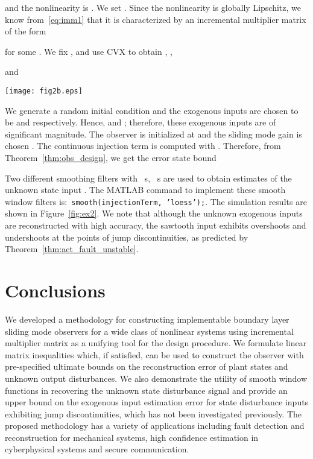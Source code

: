 \documentclass[times, doublespace]{rncauth}
\begin{document}
and the nonlinearity is . We set . Since the nonlinearity is globally Lipschitz, we know from~\eqref{eq:imm1} that it is characterized by an incremental multiplier matrix of the form 

for some . We fix ,  and use CVX to obtain , ,


and

\begin{figure*}[!ht]
	\centering
	\texttt{[image: fig2b.eps]}
	\caption{Simulation Results. (Top left) The actual (blue) and estimated (red dashed) trajectories of the unmeasured state  are shown. (Top right) Zoom-in of error trajectory and the computed plant state error bound. We note that the bound (black dashed) is not conservative. (Bottom) We illustrate that the exogenous inputs are estimated with high accuracy.}
	\label{fig:ex2}
\end{figure*}
We generate a random initial condition 
 and the exogenous inputs are chosen to be 
 and  respectively. Hence,  and ; therefore, these exogenous inputs are of significant magnitude. The observer is initialized at  and the sliding mode gain is chosen . The continuous injection term  is computed with .
Therefore, from Theorem~\ref{thm:obs_design}, we get the error state bound

Two different smoothing filters with ~s, ~s are used to obtain estimates of the unknown state input . The MATLAB command to implement these smooth window filters is:~\texttt{smooth(injectionTerm, 'loess');}. The simulation results are shown in Figure~\ref{fig:ex2}. We note that although the unknown exogenous inputs are reconstructed with high accuracy, the sawtooth input  exhibits overshoots and undershoots at the points of jump discontinuities, as predicted by Theorem~\ref{thm:act_fault_unstable}.

\section{Conclusions}\label{sec:conc}
We developed a methodology for constructing implementable boundary layer sliding mode observers for a wide class of nonlinear systems using incremental multiplier matrix as a unifying tool for the design procedure. We formulate linear matrix inequalities which, if satisfied, can be used to construct the observer with pre-specified ultimate bounds on the reconstruction error of plant states and unknown output disturbances. We also demonstrate the utility of smooth window functions in recovering the unknown state disturbance signal and provide an upper bound on the exogenous input estimation error for state disturbance inputs exhibiting jump discontinuities, which has not been investigated previously. The proposed methodology has a variety of applications including fault detection and reconstruction for mechanical systems, high confidence estimation in cyberphysical systems and secure communication.
\end{document}
